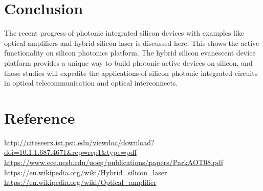 \documentclass[12pt,a4paper]{report}
\begin{document}
\newpage

\chapter{Conclusion}
The recent progress of photonic integrated silicon devices with examples like optical amplifiers and hybrid silicon laser is discussed here. This shows the active functionality on silicon photonics platform.  The  hybrid silicon evanescent device platform provides a unique way to build photonic active devices on silicon, and those studies will expedite the applications of silicon photonic integrated circuits in optical telecommunication and optical interconnects.

\newpage

\chapter{Reference}
\url{http://citeseerx.ist.psu.edu/viewdoc/download?doi=10.1.1.687.4671&rep=rep1&type=pdf}\\
\url{https://www.ece.ucsb.edu/uoeg/publications/papers/ParkAOT08.pdf}\\
\url{https://en.wikipedia.org/wiki/Hybrid_silicon_laser}\\
\url{https://en.wikipedia.org/wiki/Optical_amplifier}\\
\end{document}
